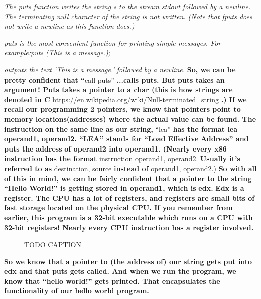 \documentclass[letterpaper]{article}
\newcommand{\sitfig}[3]{
\begin{figure}[H]
\centering
\makebox[\textwidth][c]{
#2
}
\caption{#3}
\label{#1}
\end{figure}
}
\newcommand{\sitgfx}[4][scale=1.0]{
\sitfig{#3}{\texttt{[image: \#2]}}{#4}
}
\begin{document}
\textit{The puts function writes the string s to the stream stdout followed by a newline. The terminating null character
of the string is not written. (Note that fputs does not write a newline as this function does.)}

\textit{puts is the most convenient function for printing simple messages. \newline
For example:puts ({\textquotedbl}This is a message.{\textquotedbl});}

\textit{outputs the text `This is a message.' followed by a newline.\newline
\newline
}\textbf{So, we can be pretty confident that ``}call puts'' \textbf{...calls puts. But puts takes an argument! Puts
takes a pointer to a char (this is how strings are denoted in C
}\url{https://en.wikipedia.org/wiki/Null-terminated_string}\textbf{ .) If we recall our programming 2 pointers, we know
that pointers point to memory locations(}\textbf{\textcolor[rgb]{0.21960784,0.4627451,0.11372549}{addresses}}\textbf{)
where the actual value can be found. \newline
The instruction on the same line as our string, }{}``lea''\textbf{ has the format lea operand1, operand2. ``LEA'' stands
for ``Load Effective }\textbf{\textcolor[rgb]{0.21960784,0.4627451,0.11372549}{Address}}\textbf{{}'' and puts the
}\textbf{\textcolor[rgb]{0.21960784,0.4627451,0.11372549}{address}}\textbf{ of operand2 into operand1. (Nearly every
x86 instruction has the format }instruction operand1, operand2. \textbf{Usually it's referred to as }destination,
source\textbf{ instead of }operand1, operand2.)\textbf{  \newline
So with all of this in mind, we can be fairly confident that a pointer to the string ``Hello World!'' is getting stored
in operand1, which is }\textbf{\textcolor[rgb]{0.21960784,0.4627451,0.11372549}{edx}}\textbf{.
}\textbf{\textcolor[rgb]{0.21960784,0.4627451,0.11372549}{Edx }}\textbf{is a
}\textbf{\textcolor[rgb]{0.21960784,0.4627451,0.11372549}{register}}\textbf{. The CPU has a lot of registers, and
registers are small bits of fast storage located on the physical CPU. If you remember from earlier, this program is a
32-bit executable which runs on a CPU with 32-bit registers! Nearly every CPU instruction has a register involved.}

{\centering
  
\sitgfx[width=1.9583in,height=1.8752in]{FINALWORKINGDOCFORMERLYPRECURSOR-img011.png}{fig:unk}{TODO CAPTION}
 \par}
\textbf{So we know that a pointer to (the address of) our string gets put into edx and that puts gets called. And when
we run the program, we know that ``hello world!'' gets printed. That encapsulates the functionality of our hello world
program. }
\end{document}
